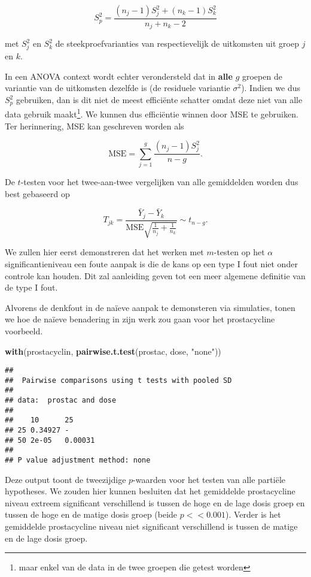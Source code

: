 \documentclass[
  12pt,dutch,coursenotes]{book}
\newenvironment{Shaded}{\begin{snugshade}}{\end{snugshade}}
\newcommand{\KeywordTok}[1]{\textcolor[rgb]{0.13,0.29,0.53}{\textbf{#1}}}
\newcommand{\NormalTok}[1]{#1}
\newcommand{\StringTok}[1]{\textcolor[rgb]{0.31,0.60,0.02}{#1}}
\theoremstyle{definition}
\theoremstyle{definition}
\theoremstyle{definition}
\theoremstyle{remark}
\begin{document}
\[S_p^2 = \frac{(n_j-1)S_j^2 + (n_k-1)S_k^2}{n_j+n_k-2}\]

met \(S_j^2\) en \(S_k^2\) de steekproefvarianties van respectievelijk de uitkomsten uit groep \(j\) en \(k\).

In een ANOVA context wordt echter verondersteld dat in \textbf{alle} \(g\) groepen de variantie van de uitkomsten dezelfde is (de residuele variantie \(\sigma^2\)). Indien we dus \(S_p^2\) gebruiken, dan is dit niet de meest efficiënte schatter omdat deze niet van alle data gebruik maakt\footnote{maar enkel van de data in de twee groepen die getest worden}. We kunnen dus efficiëntie winnen door MSE te gebruiken. Ter herinnering, MSE kan geschreven worden als

\[\text{MSE}= \sum_{j=1}^g \frac{(n_j-1)S_j^2}{n-g}.\]

De \(t\)-testen voor het twee-aan-twee vergelijken van alle gemiddelden worden dus best gebaseerd op

\[T_{jk} = \frac{\bar{Y}_j-\bar{Y}_k}{\text{MSE}\sqrt{\frac{1}{n_j}+\frac{1}{n_k}}} \sim t_{n-g}.\]

We zullen hier eerst demonstreren dat het werken met \(m\)-testen op het \(\alpha\) significantieniveau een foute aanpak is die de kans op een type I fout niet onder controle kan houden. Dit zal aanleiding geven tot een meer algemene definitie van de type I fout.

Alvorens de denkfout in de naïeve aanpak te demonsteren via simulaties, tonen we hoe de naïeve benadering in zijn werk zou gaan voor het prostacycline voorbeeld.

\begin{Shaded}
\begin{Highlighting}[]
\KeywordTok{with}\NormalTok{(prostacyclin, }\KeywordTok{pairwise.t.test}\NormalTok{(prostac, dose, }\StringTok{"none"}\NormalTok{))}
\end{Highlighting}
\end{Shaded}

\begin{verbatim}
## 
##  Pairwise comparisons using t tests with pooled SD 
## 
## data:  prostac and dose 
## 
##    10      25     
## 25 0.34927 -      
## 50 2e-05   0.00031
## 
## P value adjustment method: none
\end{verbatim}

Deze output toont de tweezijdige \(p\)-waarden voor het testen van alle partiële hypotheses.
We zouden hier kunnen besluiten dat het gemiddelde prostacycline niveau extreem significant verschillend is tussen de hoge en de lage dosis groep en tussen de hoge en de matige dosis groep (beide \(p<<0.001\)).
Verder is het gemiddelde prostacycline niveau niet significant verschillend is tussen de matige en de lage dosis groep.
\end{document}
